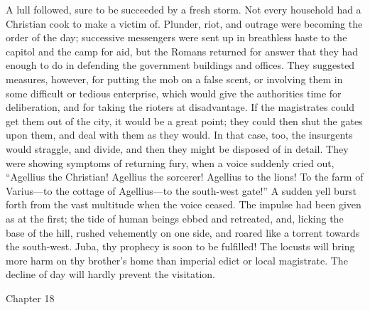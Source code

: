 A lull followed, sure to be succeeded by a fresh storm. Not every
household had a Christian cook to make a victim of. Plunder, riot, and
outrage were becoming the order of the day; successive messengers were
sent up in breathless haste to the capitol and the camp for aid, but
the Romans returned for answer that they had enough to do in defending
the government buildings and offices. They suggested measures,
however, for putting the mob on a false scent, or involving them in
some difficult or tedious enterprise, which would give the authorities
time for deliberation, and for taking the rioters at disadvantage. If
the magistrates could get them out of the city, it would be a great
point; they could then shut the gates upon them, and deal with them as
they would. In that case, too, the insurgents would straggle, and
divide, and then they might be disposed of in detail. They were
showing symptoms of returning fury, when a voice suddenly cried out,
``Agellius the Christian! Agellius the sorcerer! Agellius to the
lions! To the farm of Varius—to the cottage of Agellius—to the
south-west gate!'' A sudden yell burst forth from the vast
multitude when the voice ceased. The impulse had been given as at the
first; the tide of human beings ebbed and retreated, and, licking the
base of the hill, rushed vehemently on one side, and roared like
a torrent towards the south-west. Juba, thy prophecy is soon to be
fulfilled! The locusts will bring more harm on thy brother's home than
imperial edict or local magistrate. The decline of day will hardly
prevent the visitation.

Chapter 18


